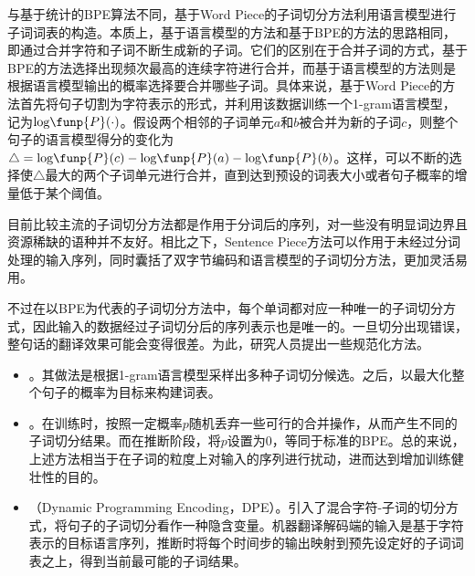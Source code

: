 \parinterval 与基于统计的BPE算法不同，基于Word Piece的子词切分方法利用语言模型进行子词词表的构造。本质上，基于语言模型的方法和基于BPE的方法的思路相同，即通过合并字符和子词不断生成新的子词。它们的区别在于合并子词的方式，基于BPE的方法选择出现频次最高的连续字符进行合并，而基于语言模型的方法则是根据语言模型输出的概率选择要合并哪些子词。具体来说，基于Word Piece的方法首先将句子切割为字符表示的形式，并利用该数据训练一个1-gram语言模型，记为$\textrm{log}\funp{P}(\cdot)$。假设两个相邻的子词单元$a$和$b$被合并为新的子词$c$，则整个句子的语言模型得分的变化为$\triangle=\textrm{log}\funp{P}(c)-\textrm{log}\funp{P}(a)-\textrm{log}\funp{P}(b)$。这样，可以不断的选择使$\triangle$最大的两个子词单元进行合并，直到达到预设的词表大小或者句子概率的增量低于某个阈值。

\parinterval 目前比较主流的子词切分方法都是作用于分词后的序列，对一些没有明显词边界且资源稀缺的语种并不友好。相比之下，Sentence Piece方法可以作用于未经过分词处理的输入序列，同时囊括了双字节编码和语言模型的子词切分方法，更加灵活易用。

\parinterval 不过在以BPE为代表的子词切分方法中，每个单词都对应一种唯一的子词切分方式，因此输入的数据经过子词切分后的序列表示也是唯一的。一旦切分出现错误，整句话的翻译效果可能会变得很差。为此，研究人员提出一些规范化方法。

\begin{itemize}
\vspace{0.5em}
\item {\small{}}。其做法是根据1-gram语言模型采样出多种子词切分候选。之后，以最大化整个句子的概率为目标来构建词表。
\vspace{0.5em}
\item {\small{}}。在训练时，按照一定概率$p$随机丢弃一些可行的合并操作，从而产生不同的子词切分结果。而在推断阶段，将$p$设置为0，等同于标准的BPE。总的来说，上述方法相当于在子词的粒度上对输入的序列进行扰动，进而达到增加训练健壮性的目的。
\vspace{0.5em}
\item {\small{}}（Dynamic Programming Encoding，DPE）。引入了混合字符-子词的切分方式，将句子的子词切分看作一种隐含变量。机器翻译解码端的输入是基于字符表示的目标语言序列，推断时将每个时间步的输出映射到预先设定好的子词词表之上，得到当前最可能的子词结果。
\vspace{0.5em}
\end{itemize}

